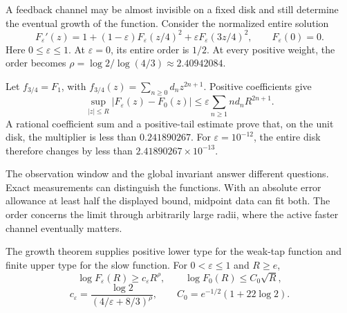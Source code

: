 A feedback channel may be almost invisible on a fixed disk and still determine
the eventual growth of the function. Consider the normalized entire solution
\[
F_\varepsilon'(z)=1+(1-\varepsilon)F_\varepsilon(z/4)^2
 +\varepsilon F_\varepsilon(3z/4)^2,
\qquad F_\varepsilon(0)=0.
\]
Here $0\le\varepsilon\le1$. At $\varepsilon=0$, its entire order is $1/2$.
At every positive weight, the order becomes
$\rho=\log2/\log(4/3)\approx2.40942084$.


Let $f_{3/4}=F_1$, with $f_{3/4}(z)=\sum_{n\ge0}d_nz^{2n+1}$.
Positive coefficients give
\[
\sup_{|z|\le R}|F_\varepsilon(z)-F_0(z)|
\le\varepsilon\sum_{n\ge1}nd_nR^{2n+1}.
\]
A rational coefficient sum and a positive-tail estimate prove that, on the
unit disk, the multiplier is less than $0.241890267$.
For $\varepsilon=10^{-12}$, the entire disk therefore changes by less than
$2.41890267\times10^{-13}$.

The observation window and the global invariant answer different questions.
Exact measurements can distinguish the functions. With an absolute error
allowance at least half the displayed bound, midpoint data can fit both.
The order concerns the limit through arbitrarily large radii, where the
active faster channel eventually matters.

The growth theorem supplies positive lower type for the weak-tap function
and finite upper type for the slow function. For $0<\varepsilon\le1$ and $R\ge e$,
\[
\log F_\varepsilon(R)\ge c_\varepsilon R^\rho,
\qquad \log F_0(R)\le C_0\sqrt R,
\]
\[
c_\varepsilon=\frac{\log2}{(4/\varepsilon+8/3)^\rho},
\qquad C_0=e^{-1/2}(1+22\log2).
\]


